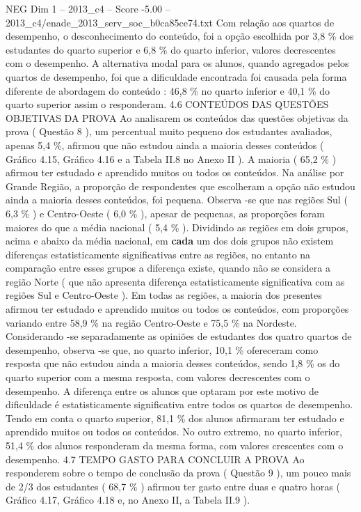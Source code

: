 \begin{textsample}{NEG Dim 1 – 2013\_c4 – Score -5.00 – 2013\_c4/enade\_2013\_serv\_soc\_b0ca85ce74.txt}
Com relação aos quartos de desempenho, o desconhecimento do conteúdo, foi a opção escolhida por 3,8 \% dos estudantes do quarto superior e 6,8 \% do quarto inferior, valores decrescentes com o desempenho.
A alternativa modal para os alunos, quando agregados pelos quartos de desempenho, foi que a dificuldade encontrada foi causada pela forma diferente de abordagem do conteúdo : 46,8 \% no quarto inferior e 40,1 \% do quarto superior assim o responderam. 4.6 CONTEÚDOS DAS QUESTÕES OBJETIVAS DA PROVA Ao analisarem os conteúdos das questões objetivas da prova ( Questão 8 ), um percentual muito pequeno dos estudantes avaliados, apenas 5,4 \%, afirmou que não estudou ainda a maioria desses conteúdos ( Gráfico 4.15, Gráfico 4.16 e a Tabela II.8 no Anexo II ).
A maioria ( 65,2 \% ) afirmou ter estudado e aprendido muitos ou todos os conteúdos.
Na análise por Grande Região, a proporção de respondentes que escolheram a opção não estudou ainda a maioria desses conteúdos, foi pequena.
Observa -se que nas regiões Sul ( 6,3 \% ) e Centro-Oeste ( 6,0 \% ), apesar de pequenas, as proporções foram maiores do que a média nacional ( 5,4 \% ).
Dividindo as regiões em dois grupos, acima e abaixo da média nacional, em \textbf{cada} um dos dois grupos não existem diferenças estatisticamente significativas entre as regiões, no entanto na comparação entre esses grupos a diferença existe, quando não se considera a região Norte ( que não apresenta diferença estatisticamente significativa com as regiões Sul e Centro-Oeste ).
Em todas as regiões, a maioria dos presentes afirmou ter estudado e aprendido muitos ou todos os conteúdos, com proporções variando entre 58,9 \% na região Centro-Oeste e 75,5 \% na Nordeste.
Considerando -se separadamente as opiniões de estudantes dos quatro quartos de desempenho, observa -se que, no quarto inferior, 10,1 \% ofereceram como resposta que não estudou ainda a maioria desses conteúdos, sendo 1,8 \% os do quarto superior com a mesma resposta, com valores decrescentes com o desempenho.
A diferença entre os alunos que optaram por este motivo de dificuldade é estatisticamente significativa entre todos os quartos de desempenho.
Tendo em conta o quarto superior, 81,1 \% dos alunos afirmaram ter estudado e aprendido muitos ou todos os conteúdos.
No outro extremo, no quarto inferior, 51,4 \% dos alunos responderam da mesma forma, com valores crescentes com o desempenho. 4.7 TEMPO GASTO PARA CONCLUIR A PROVA Ao responderem sobre o tempo de conclusão da prova ( Questão 9 ), um pouco mais de 2/3 dos estudantes ( 68,7 \% ) afirmou ter gasto entre duas e quatro horas ( Gráfico 4.17, Gráfico 4.18 e, no Anexo II, a Tabela II.9 ).

\end{textsample}
